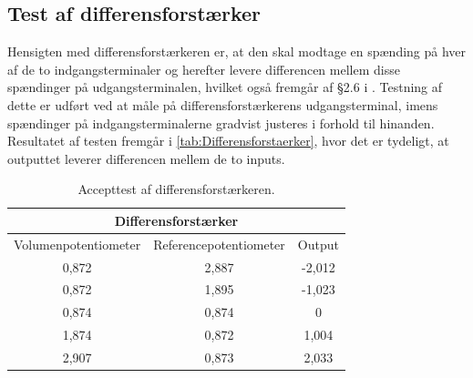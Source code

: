 \subsection{Test af differensforstærker}
Hensigten med differensforstærkeren er, at den skal modtage en spænding på hver af de to indgangsterminaler og herefter levere differencen mellem disse spændinger på udgangsterminalen, hvilket også fremgår af §2.6 i . Testning af dette er udført ved at måle på differensforstærkerens udgangsterminal, imens spændinger på indgangsterminalerne gradvist justeres i forhold til hinanden. Resultatet af testen fremgår i \autoref{tab:Differensforstaerker}, hvor det er tydeligt, at outputtet leverer differencen mellem de to inputs.
%
\begin{table}[H]
\centering
\begin{tabular}{|c|c|c|}
\hline
\multicolumn{3}{|c|}{Differensforstærker}              \\ \hline
Volumenpotentiometer & Referencepotentiometer & Output \\ \hline
0,872                  & 2,887                & -2,012 \\ \hline
0,872                   & 1,895               & -1,023 \\ \hline
0,874                   & 0,874               & 0      \\ \hline
1,874                   & 0,872               & 1,004  \\ \hline
2,907                   & 0,873               & 2,033  \\ \hline
\end{tabular}
\caption{Accepttest af differensforstærkeren.}
\label{tab:Differensforstaerker}
\end{table}
%
